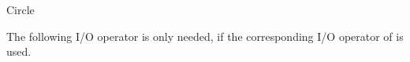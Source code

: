 \begin{ccClass}{Circle}

The following I/O operator is only needed, if the corresponding I/O
operator of  is used.

\ccHtmlNoIndex
{}


\ccRestoreThreeColumns

\end{ccClass}
\ccAutoIndexingOn

